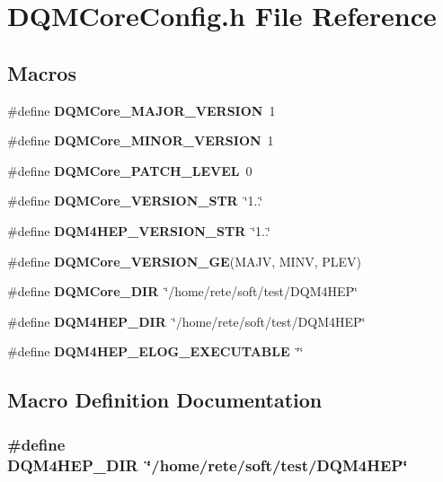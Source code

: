 \section{D\+Q\+M\+Core\+Config.\+h File Reference}
\label{DQMCoreConfig_8h}
\subsection*{Macros}
\begin{DoxyCompactItemize}
\item 
\#define {\bf D\+Q\+M\+Core\+\_\+\+M\+A\+J\+O\+R\+\_\+\+V\+E\+R\+S\+I\+O\+N}~1
\item 
\#define {\bf D\+Q\+M\+Core\+\_\+\+M\+I\+N\+O\+R\+\_\+\+V\+E\+R\+S\+I\+O\+N}~1
\item 
\#define {\bf D\+Q\+M\+Core\+\_\+\+P\+A\+T\+C\+H\+\_\+\+L\+E\+V\+E\+L}~0
\item 
\#define {\bf D\+Q\+M\+Core\+\_\+\+V\+E\+R\+S\+I\+O\+N\+\_\+\+S\+T\+R}~\char`\"{}1..\char`\"{}
\item 
\#define {\bf D\+Q\+M4\+H\+E\+P\+\_\+\+V\+E\+R\+S\+I\+O\+N\+\_\+\+S\+T\+R}~\char`\"{}1..\char`\"{}
\item 
\#define {\bf D\+Q\+M\+Core\+\_\+\+V\+E\+R\+S\+I\+O\+N\+\_\+\+G\+E}(M\+A\+J\+V, M\+I\+N\+V, P\+L\+E\+V)
\item 
\#define {\bf D\+Q\+M\+Core\+\_\+\+D\+I\+R}~\char`\"{}/home/rete/soft/test/D\+Q\+M4\+H\+E\+P\char`\"{}
\item 
\#define {\bf D\+Q\+M4\+H\+E\+P\+\_\+\+D\+I\+R}~\char`\"{}/home/rete/soft/test/D\+Q\+M4\+H\+E\+P\char`\"{}
\item 
\#define {\bf D\+Q\+M4\+H\+E\+P\+\_\+\+E\+L\+O\+G\+\_\+\+E\+X\+E\+C\+U\+T\+A\+B\+L\+E}~\char`\"{}\char`\"{}
\end{DoxyCompactItemize}


\subsection{Macro Definition Documentation}
\subsubsection[{D\+Q\+M4\+H\+E\+P\+\_\+\+D\+I\+R}]{\setlength{\rightskip}{0pt plus 5cm}\#define D\+Q\+M4\+H\+E\+P\+\_\+\+D\+I\+R~\char`\"{}/home/rete/soft/test/D\+Q\+M4\+H\+E\+P\char`\"{}}\label{DQMCoreConfig_8h_a5972ce48fa8c49a819f2ba554bb2066f}


